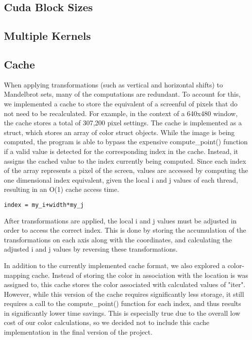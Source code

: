 \documentclass{article}
\begin{document}
\subsection{Cuda Block Sizes}

\subsection{Multiple Kernels}

\subsection{Cache}

When applying transformations (such as vertical and horizontal shifts) to Mandelbrot sets, many of the computations are redundant. To account for this, we implemented a cache to store the equivalent of a screenful of pixels that do not need to be recalculated. For example, in the context of a 640x480 window, the cache stores a total of 307,200 pixel settings. The cache is implemented as a struct, which stores an array of color struct objects. While the image is being computed, the program is able to bypass the expensive compute\_point() function if a valid value is detected for the corresponding index in the cache. Instead, it assigns the cached value to the index currently being computed. Since each index of the array represents a pixel of the screen, values are accessed by computing the one dimensional index equivalent, given the local i and j values of each thread, resulting in an O(1) cache access time. 

\begin{verbatim}
index = my_i+width*my_j
\end{verbatim}

After transformations are applied, the local i and j values must be adjusted in order to access the correct index. This is done by storing the accumulation of the transformations on each axis along with the coordinates, and calculating the adjusted i and j values by reversing these transformations. 

In addition to the currently implemented cache format, we also explored a color-mapping cache. Instead of storing the color in association with the location is was assigned to, this cache stores the color associated with calculated values of "iter". However, while this version of the cache requires significantly less storage, it still requires a call to the compute\_point() function for each index, and thus results in significantly lower time savings. This is especially true due to the overall low cost of our color calculations, so we decided not to include this cache implementation in the final version of the project.
\end{document}
